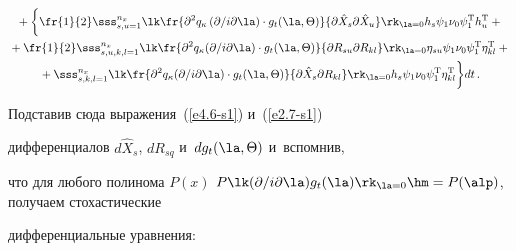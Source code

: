     \begin{multline*}

{}+ \biggl\{ \fr{1}{2} \sss_{s,u=1}^{n_x} \lk \fr{\partial^2 q_\kappa

    \left(\partial /i\partial \la\right)\cdot g_t (\la,\Theta)}{\partial \hat X_s

    \partial \hat X_u }\rk_{\la=0} h_s \psi_1\nu_0\psi_1^{\mathrm{T}} h_u^{\mathrm{T}} +{}\\

{}+

   \fr{1}{2} \sss_{s,u,k,l=1}^{n_x} \lk \fr{\partial^2 q_\kappa (\partial

    /i\partial \la)\cdot

    g_t (\la,\Theta)}{\partial R_{su} \partial R_{kl}}

    \rk_{\la=0} \eta_{su} \psi_1\nu_0\psi_1^{\mathrm{T}} \eta_{kl}^{\mathrm{T}}+{}\\

{}+\sss_{s,k,l=1}^{n_x} \lk \fr{\partial^2 q_\kappa (\partial /i\partial

    \la)\cdot g_t (\la,\Theta)}

    {\partial \hat X_s \partial R_{kl}}\rk_{\la=0}h_s \psi_1\nu_0\psi_1^{\mathrm{T}} \eta_{kl}^{\mathrm{T}}

    \biggr\} dt\,. %

    \end{multline*}

Подставив сюда выражения~(\ref{e4.6-s1}) и~(\ref{e2.7-s1})

дифференциалов $d\hat X_s$, $dR_{sq}$  и~$dg_t (\la,\Theta)$ и~вспомнив,

что для любого полинома  $P(x)$ $P\lk (\partial /i\partial

\la) g_t(\la)\rk_{\la=0}\hm=P(\alp)$, получаем стохастические

дифференциальные уравнения:



\vspace*{-2pt}



\noindent

